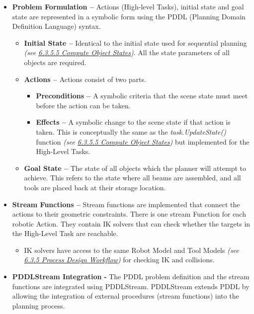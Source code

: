 \begin{itemize}
	\item \textbf{Problem Formulation --} Actions (High-level Tasks), initial state and goal state are represented in a symbolic form using the PDDL (Planning Domain Definition Language) syntax.

\begin{itemize}
	\item \textbf{Initial State --} Identical to the initial state used for sequential planning \textit{(see \ul{6.3.5.5 Compute Object States})}. All the state parameters of all objects are required.

	\item \textbf{Actions --} Actions consist of two parts. 

\begin{itemize}
	\item \textbf{Preconditions --} A symbolic criteria that the scene state must meet before the action can be taken. 

	\item \textbf{Effects --} A symbolic change to the scene state if that action is taken. This is conceptually the same as the \textit{task.UpdateState()} function \textit{(see \ul{6.3.5.5 Compute Object States})} but implemented for the High-Level Tasks.

\end{itemize}
	\item \textbf{Goal State --} The state of all objects which the planner will attempt to achieve. This refers to the state where all beams are assembled, and all tools are placed back at their storage location.

\end{itemize}
	\item \textbf{Stream Functions --} Stream functions are implemented that connect the actions to their geometric constraints. There is one stream Function for each robotic Action. They contain IK solvers that can check whether the targets in the High-Level Task are reachable.

\begin{itemize}
	\item IK solvers have access to the same Robot Model and Tool Models \textit{(see \ul{6.3.5 Process Design Workflow})} for checking IK and collisions.

\end{itemize}
	\item \textbf{PDDLStream Integration} \textbf{-} The PDDL problem definition and the stream functions are integrated using PDDLStream. PDDLStream extends PDDL by allowing the integration of external procedures (stream functions) into the planning process.


\end{itemize}
